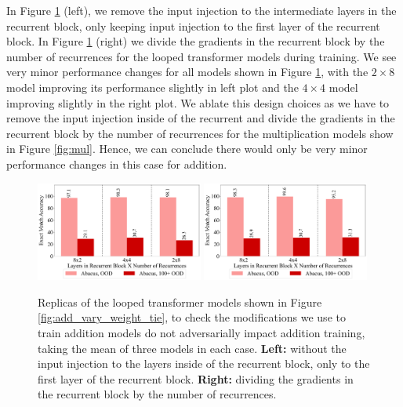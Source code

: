 \documentclass{article}
\begin{document}
In Figure \ref{fig:app_vary_depth_no_skip} (left), we remove the input injection to the intermediate layers in the recurrent block, only keeping input injection to the first layer of the recurrent block.
In Figure \ref{fig:app_vary_depth_no_skip} (right) we divide the gradients in the recurrent block by the number of recurrences for the looped transformer models during training.
We see very minor performance changes for all models shown in Figure \ref{fig:app_vary_depth_no_skip}, with the \(2\times 8\) model improving its performance slightly in left plot and the \(4 \times 4\) model improving slightly in the right plot.
We ablate this design choices as we have to remove the input injection inside of the recurrent and divide the gradients in the recurrent block by the number of recurrences for the multiplication models show in Figure \ref{fig:mul}.
Hence, we can conclude there would only be very minor performance changes in this case for addition.

\begin{figure}[ht!]
    \centering
    \includegraphics[width=0.49\textwidth]{Figures/plot_18_2_bars.pdf}
    \includegraphics[width=0.49\textwidth]{Figures/plot_19_2_bars.pdf}
    \caption{
    Replicas of the looped transformer models shown in Figure \ref{fig:add_vary_weight_tie}, to check the modifications we use to train addition models do not adversarially impact addition training, taking the mean of three models in each case.
    \textbf{Left: }without the input injection to the layers inside of the recurrent block, only to the first layer of the recurrent block.
    \textbf{Right: }dividing the gradients in the recurrent block by the number of recurrences.
    }
    \label{fig:app_vary_depth_no_skip}
\end{figure}
\end{document}
